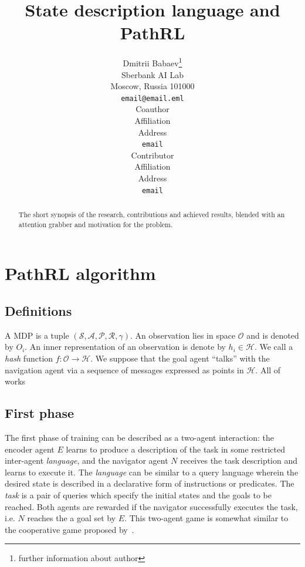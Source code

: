 \documentclass{article}
\title{State description language and PathRL}
\author{%
    Dmitrii Babaev\thanks{further information about author}\\
    Sberbank AI Lab\\
    Moscow, Russia 101000 \\
    \texttt{email@email.eml} \\
    \And
    Coauthor \\
    Affiliation \\
    Address \\
    \texttt{email} \\
    \And
    Contributor \\
    Affiliation \\
    Address \\
    \texttt{email} \\
}
\newcommand{\attn}[1]{{\color{magenta}{\textbf{#1}}}}
\begin{document}
\maketitle

\begin{abstract}
    The short synopsis of the research, contributions and achieved results,
    blended with an attention grabber and motivation for the problem.
\end{abstract}

\section{PathRL algorithm}

\subsection{Definitions}

A MDP is a tuple $(\mathcal{S}, \mathcal{A}, \mathcal{P}, \mathcal{R}, \gamma)$. An observation lies in space $\mathcal{O}$ and is denoted by $O_i$. An inner representation of an observation is denote by $h_i \in \mathcal{H}$. We call a \emph{hash} \attn{representation} function $
f: \mathcal{O} \rightarrow \mathcal{H}
$. We suppose that the goal agent ``talks'' with the navigation agent via a sequence of messages expressed as points in $\mathcal{H}$. All of works 


\subsection{First phase}

The first phase of training can be described as a two-agent interaction: the encoder agent $E$ learns to produce a description of the task in some restricted inter-agent \emph{language}, and the navigator agent $N$ receives the task description and learns to execute it.
%
The \emph{language} can be similar to a query language wherein the desired state is described in a declarative form of instructions or predicates. The \emph{task} is a pair of queries which specify the initial states and the goals to be reached.
%
Both agents are rewarded if the navigator successfully executes the task, i.e. $N$ reaches the a goal set by $E$.
This two-agent game is somewhat similar to the cooperative game proposed by~\citet{Mordatch2018EmergenceOG}.
\end{document}
